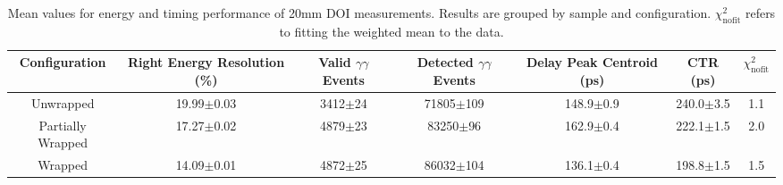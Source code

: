 \begin{table}
\caption{\label{tab:doictrresults-20} Mean values for energy and timing performance of 20mm DOI measurements. Results are grouped by sample and configuration. $\chi^2_\text{nofit}$ refers to fitting the weighted mean to the data.}
\begin{tabular}{ccccccc}
\hline
Configuration & Right Energy Resolution (\%) & Valid $\gamma\gamma$ Events & Detected $\gamma\gamma$ Events & Delay Peak Centroid (ps)  & CTR (ps) &  $\chi^2_\text{nofit}$ \\
\hline
        Unwrapped     &  19.99$\pm$0.03 &  3412$\pm$24 &  71805$\pm$109 &  148.9$\pm$0.9 &  240.0$\pm$3.5 &    1.1 \\
        Partially Wrapped   &  17.27$\pm$0.02 &  4879$\pm$23 &   83250$\pm$96 &  162.9$\pm$0.4 &  222.1$\pm$1.5 &    2.0 \\
        Wrapped       &  14.09$\pm$0.01 &  4872$\pm$25 &  86032$\pm$104 &  136.1$\pm$0.4 &  198.8$\pm$1.5 &    1.5 \\
\hline
\end{tabular}
\end{table}


